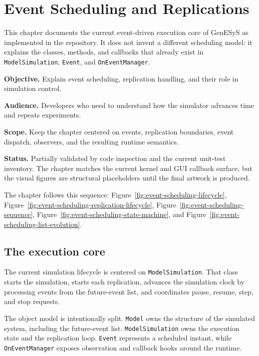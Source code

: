\chapter{Event Scheduling and Replications}
\label{chap:event-scheduling-and-replications}

This chapter documents the current event-driven execution core of GenESyS as
implemented in the repository. It does not invent a different scheduling model:
it explains the classes, methods, and callbacks that already exist in
\texttt{ModelSimulation}, \texttt{Event}, and \texttt{OnEventManager}.

\noindent\textbf{Objective.} Explain event scheduling, replication handling,
and their role in simulation control.

\noindent\textbf{Audience.} Developers who need to understand how the simulator advances time and repeats experiments.

\noindent\textbf{Scope.} Keep the chapter centered on events, replication
boundaries, event dispatch, observers, and the resulting runtime semantics.

\noindent\textbf{Status.} Partially validated by code inspection and the current
unit-test inventory. The chapter matches the current kernel and GUI callback
surface, but the visual figures are structural placeholders until the final
artwork is produced.

The chapter follows this sequence:
Figure~\ref{fig:event-scheduling-lifecycle},
Figure~\ref{fig:event-scheduling-replication-lifecycle},
Figure~\ref{fig:event-scheduling-sequence},
Figure~\ref{fig:event-scheduling-state-machine}, and
Figure~\ref{fig:event-scheduling-list-evolution}.

\section{The execution core}
\label{sec:event-scheduling-core}

The current simulation lifecycle is centered on \texttt{ModelSimulation}. That
class starts the simulation, starts each replication, advances the simulation
clock by processing events from the future-event list, and coordinates pause,
resume, step, and stop requests.

The object model is intentionally split. \texttt{Model} owns the structure of
the simulated system, including the future-event list. \texttt{ModelSimulation}
owns the execution state and the replication loop. \texttt{Event} represents a
scheduled instant, while \texttt{OnEventManager} exposes observation and
callback hooks around the runtime.

